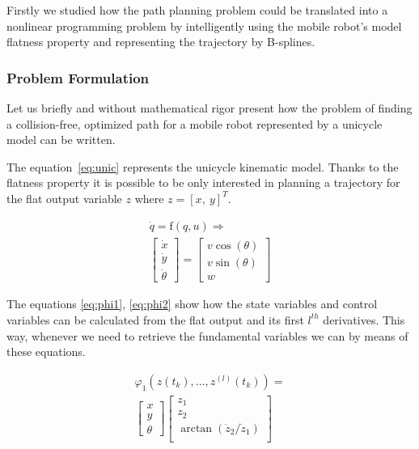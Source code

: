 Firstly we studied how the path planning problem could be translated into a nonlinear programming problem by intelligently using the mobile robot's model flatness property and representing the trajectory by B-splines.

\subsubsection{Problem Formulation}

Let us briefly and without mathematical rigor present how the problem of finding a collision-free, optimized path for a mobile robot represented by a unicycle model can be written.

The equation~\ref{eq:unic} represents the unicycle kinematic model. Thanks to the flatness property it is possible to be only interested in planning a trajectory for the flat output variable $z$ where $z = [x,\ y]^T$.

\begin{equation}\label{eq:unic}
\begin{array}{c}
\dot{q} = \mathrm{f}(q, u) \Rightarrow\\
\left[\begin{array}{c}
\dot{x}\\
\dot{y}\\
\dot{\theta}
\end{array}\right]=
\left[\begin{array}{c}
v\cos(\theta)\\
v\sin(\theta)\\
w
\end{array}\right]
\end{array}    
\end{equation}

The equations \ref{eq:phi1}, \ref{eq:phi2} show how the state variables and control variables can be calculated from the flat output and its first $l^{th}$ derivatives. This way, whenever we need to retrieve the fundamental variables we can by means of these equations.

\begin{equation}\label{eq:phi1}
            \begin{array}{l}
            \varphi_1(z(t_k),\dotsc,z^{(l)}(t_k))=\\
            \left[\begin{array}{c}
            x\\
            y\\
            \theta
            \end{array}\right]
            \left[\begin{array}{c}
            z_1\\
            z_2\\
            \arctan(\dot{z}_2/\dot{z}_1)\\
            \end{array}\right]
            \end{array}
\end{equation}

